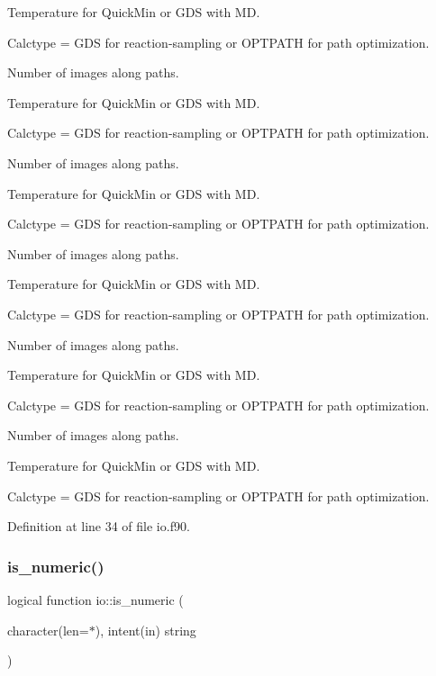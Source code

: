Temperature for Quick\+Min or G\+DS with MD.

Calctype = \textquotesingle{}G\+DS\textquotesingle{} for reaction-\/sampling or \textquotesingle{}O\+P\+T\+P\+A\+TH\textquotesingle{} for path optimization.

Number of images along paths.

Temperature for Quick\+Min or G\+DS with MD.

Calctype = \textquotesingle{}G\+DS\textquotesingle{} for reaction-\/sampling or \textquotesingle{}O\+P\+T\+P\+A\+TH\textquotesingle{} for path optimization.

Number of images along paths.

Temperature for Quick\+Min or G\+DS with MD.

Calctype = \textquotesingle{}G\+DS\textquotesingle{} for reaction-\/sampling or \textquotesingle{}O\+P\+T\+P\+A\+TH\textquotesingle{} for path optimization.

Number of images along paths.

Temperature for Quick\+Min or G\+DS with MD.

Calctype = \textquotesingle{}G\+DS\textquotesingle{} for reaction-\/sampling or \textquotesingle{}O\+P\+T\+P\+A\+TH\textquotesingle{} for path optimization.

Number of images along paths.

Temperature for Quick\+Min or G\+DS with MD.

Calctype = \textquotesingle{}G\+DS\textquotesingle{} for reaction-\/sampling or \textquotesingle{}O\+P\+T\+P\+A\+TH\textquotesingle{} for path optimization.

Number of images along paths.

Temperature for Quick\+Min or G\+DS with MD.

Calctype = \textquotesingle{}G\+DS\textquotesingle{} for reaction-\/sampling or \textquotesingle{}O\+P\+T\+P\+A\+TH\textquotesingle{} for path optimization. 

Definition at line 34 of file io.\+f90.

\mbox{\label{namespaceio_a386a5703d972e990643b637ef0bd8d58}} 
\subsubsection{\texorpdfstring{is\+\_\+numeric()}{is\_numeric()}}
{\footnotesize\ttfamily logical function io\+::is\+\_\+numeric (\begin{DoxyParamCaption}\item[{character(len=$\ast$), intent(in)}]{string }\end{DoxyParamCaption})}



